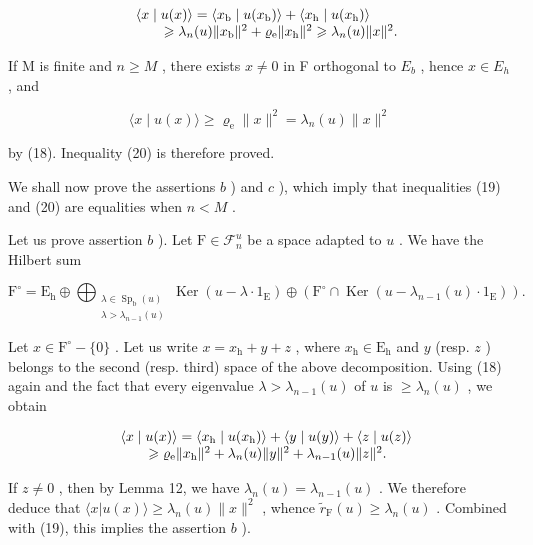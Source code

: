 \[
\begin{array}{r l} & {\langle x \mid u (x) \rangle = \langle x _ {\mathrm{b}} \mid u (x _ {\mathrm{b}}) \rangle + \langle x _ {\mathrm{h}} \mid u (x _ {\mathrm{h}}) \rangle} \\ & {\qquad \geqslant \lambda_ {n} (u) \| x _ {\mathrm{b}} \| ^ {2} + \varrho_ {\mathrm{e}} \| x _ {\mathrm{h}} \| ^ {2} \geqslant \lambda_ {n} (u) \| x \| ^ {2}.} \end{array}
\]

If M is finite and \(n \geqslant M\) , there exists \(x \neq 0\) in F orthogonal to \(E_{b}\) , hence \(x \in E_{h}\) , and

\[
\langle x \mid u (x) \rangle \geqslant \varrho_ {\mathrm{e}} \| x \| ^ {2} = \lambda_ {n} (u) \| x \| ^ {2}
\]

by (18). Inequality (20) is therefore proved.

We shall now prove the assertions \(b\) ) and \(c\) ), which imply that inequalities (19) and (20) are equalities when \(n < M\) .

Let us prove assertion \(b\) ). Let \(\mathrm{F} \in \mathcal{F}_n^u\) be a space adapted to \(u\) . We have the Hilbert sum

\[
\mathrm{F}^{\circ} = \mathrm{E}_{\mathrm{h}}\oplus \bigoplus_{\substack{\lambda \in \operatorname{Sp}_{\mathrm{b}}(u)\\ \lambda >\lambda_{n - 1}(u)}}\operatorname{Ker}(u - \lambda \cdot 1_{\mathrm{E}})\oplus (\mathrm{F}^{\circ}\cap \operatorname{Ker}(u - \lambda_{n - 1}(u)\cdot 1_{\mathrm{E}})).
\]

Let \(x \in \mathrm{F}^{\circ} - \{0\}\) . Let us write \(x = x_{\mathrm{h}} + y + z\) , where \(x_{\mathrm{h}} \in \mathrm{E}_{\mathrm{h}}\) and \(y\) (resp. \(z\) ) belongs to the second (resp. third) space of the above decomposition. Using (18) again and the fact that every eigenvalue \(\lambda > \lambda_{n-1}(u)\) of \(u\) is \(\geqslant \lambda_n(u)\) , we obtain

\[
\begin{array}{r l} & {\langle x \mid u (x) \rangle = \langle x _ {\mathrm{h}} \mid u (x _ {\mathrm{h}}) \rangle + \langle y \mid u (y) \rangle + \langle z \mid u (z) \rangle} \\ & {\qquad \geqslant \varrho_ {\mathrm{e}} \| x _ {\mathrm{h}} \| ^ {2} + \lambda_ {n} (u) \| y \| ^ {2} + \lambda_ {n - 1} (u) \| z \| ^ {2}.} \end{array}
\]

If \(z \neq 0\) , then by Lemma 12, we have \(\lambda_n(u) = \lambda_{n-1}(u)\) . We therefore deduce that \(\langle x | u(x) \rangle \geqslant \lambda_n(u) \| x \|^2\) , whence \(\widetilde{r}_{\mathrm{F}}(u) \geqslant \lambda_n(u)\) . Combined with (19), this implies the assertion \(b\) ).

